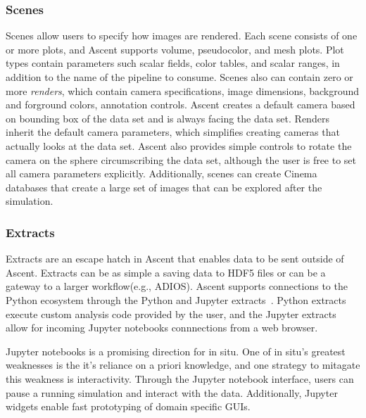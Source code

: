 \subsubsection{Scenes}
Scenes allow users to specify how images are rendered.
%
Each scene consists of one or more plots, and Ascent supports volume,
pseudocolor, and mesh plots.
%
Plot types contain parameters such scalar fields, color tables, and scalar ranges,
in addition to the name of the pipeline to consume.
%
Scenes also can contain zero or more \textit{renders}, which contain
camera specifications, image dimensions, background and
forground colors, annotation controls.
%
Ascent creates a default camera based on bounding box of the data set and
is always facing the data set.
%
Renders inherit the default camera parameters, which simplifies creating
cameras that actually looks at the data set.
%
Ascent also provides simple controls to rotate the camera on the
sphere circumscribing the data set, although the user is free to set all
camera parameters explicitly.
%
Additionally, scenes can create Cinema~\cite{AhrensCinema} databases that
create a large set of images that can be explored after the simulation.

\subsubsection{Extracts}
Extracts are an escape hatch in Ascent that enables data to be sent
outside of Ascent.
%
Extracts can be as simple a saving data to HDF5 files or can be a gateway
to a larger workflow(e.g., ADIOS).
%
Ascent supports connections to the Python ecosystem through the Python and
Jupyter extracts~\cite{CyrusISAV}.
%
Python extracts execute custom analysis code provided by the user, and the
Jupyter extracts allow for incoming Jupyter notebooks connnections from a web
browser.
%

Jupyter notebooks is a promising direction for in situ.
%
One of in situ's greatest weaknesses is the it's reliance on a priori
knowledge, and one strategy to mitagate this weakness is interactivity.
%
Through the Jupyter notebook interface, users can pause a running simulation
and interact with the data.
%
Additionally, Jupyter widgets enable fast prototyping of domain specific
GUIs.


